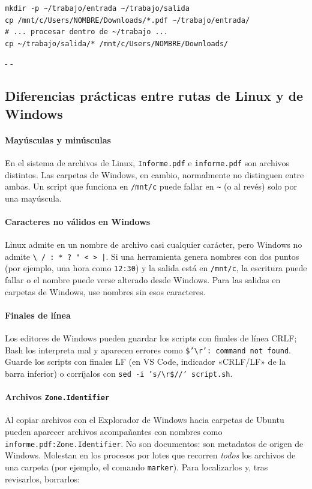 \documentclass[11pt,a4paper]{article}
\makeatletter
\newcommand{\necesitaespacio}[1]{\par\penalty-100\begingroup
	\setlength{\dimen@}{#1}\dimen@ii\pagegoal\advance\dimen@ii-\pagetotal
	\ifdim\dimen@>\dimen@ii\ifdim\dimen@ii>\z@\vfil\fi\penalty-\@M\fi\endgroup}
\newcommand{\cmd}[1]{\texttt{\textcolor{colcmd}{#1}}}      %
\newcommand{\arch}[1]{\texttt{\textcolor{colarch}{#1}}}    %
\newcommand{\bs}{\textbackslash{}}    %
\newcommand{\tl}{\textasciitilde{}}  %
\makeatother
\begin{document}
	\begin{lstlisting}
mkdir -p ~/trabajo/entrada ~/trabajo/salida
cp /mnt/c/Users/NOMBRE/Downloads/*.pdf ~/trabajo/entrada/
# ... procesar dentro de ~/trabajo ...
cp ~/trabajo/salida/* /mnt/c/Users/NOMBRE/Downloads/
\end{lstlisting}
	
	\necesitaespacio{8\baselineskip}
	\subsection{Diferencias prácticas entre rutas de Linux y de Windows}\label{sec:diferencias-wsl}
	
	\paragraph{Mayúsculas y minúsculas} En el sistema de archivos de Linux, \arch{Informe.pdf} e \arch{informe.pdf} son archivos distintos. Las carpetas de Windows, en cambio, normalmente no distinguen entre ambas. Un script que funciona en \arch{/mnt/c} puede fallar en \arch{\tl} (o al revés) solo por una mayúscula.
	
	\paragraph{Caracteres no válidos en Windows} Linux admite en un nombre de archivo casi cualquier carácter, pero Windows no admite \texttt{\bs{} / : * ? " < > |}. Si una herramienta genera nombres con dos puntos (por ejemplo, una hora como \texttt{12:30}) y la salida está en \arch{/mnt/c}, la escritura puede fallar o el nombre puede verse alterado desde Windows. Para las salidas en carpetas de Windows, use nombres sin esos caracteres.
	
	\paragraph{Finales de línea} Los editores de Windows pueden guardar los scripts con finales de línea CRLF; Bash los interpreta mal y aparecen errores como \texttt{\$'\bs{}r': command not found}. Guarde los scripts con finales LF (en VS Code, indicador «CRLF/LF» de la barra inferior) o corríjalos con \cmd{sed -i 's/\bs{}r\$//' script.sh}.
	
	\paragraph{Archivos \texttt{Zone.Identifier}} Al copiar archivos con el Explorador de Windows hacia carpetas de Ubuntu pueden aparecer archivos acompañantes con nombres como \arch{informe.pdf:Zone.Identifier}. No son documentos: son metadatos de origen de Windows. Molestan en los procesos por lotes que recorren \emph{todos} los archivos de una carpeta (por ejemplo, el comando \cmd{marker}). Para localizarlos y, tras revisarlos, borrarlos:
	
\end{document}
